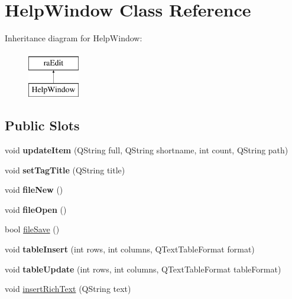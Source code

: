 \hypertarget{classHelpWindow}{
\section{HelpWindow Class Reference}
\label{classHelpWindow}
}
Inheritance diagram for HelpWindow:\begin{figure}[H]
\begin{center}
\leavevmode
\includegraphics[height=2.000000cm]{classHelpWindow}
\end{center}
\end{figure}
\subsection*{Public Slots}
\begin{DoxyCompactItemize}
\item 
\hypertarget{classHelpWindow_a2a22e67622ca5caec13541c54d83c34e}{
void {\bfseries updateItem} (QString full, QString shortname, int count, QString path)}
\label{classHelpWindow_a2a22e67622ca5caec13541c54d83c34e}

\item 
\hypertarget{classHelpWindow_a003f5e69d146673c6fffbd2b61b8457c}{
void {\bfseries setTagTitle} (QString title)}
\label{classHelpWindow_a003f5e69d146673c6fffbd2b61b8457c}

\item 
\hypertarget{classHelpWindow_a238e9ecb48e1b03fafc9fdec485b38ff}{
void {\bfseries fileNew} ()}
\label{classHelpWindow_a238e9ecb48e1b03fafc9fdec485b38ff}

\item 
\hypertarget{classHelpWindow_a156cdefe1185e8463401180539d1f1d7}{
void {\bfseries fileOpen} ()}
\label{classHelpWindow_a156cdefe1185e8463401180539d1f1d7}

\item 
bool \hyperlink{classHelpWindow_a72a7a043e82cda7bbe3947d6e42b1091}{fileSave} ()
\item 
\hypertarget{classHelpWindow_a26b2d65fb4edc7e17e5e128c7502ed2a}{
void {\bfseries tableInsert} (int rows, int columns, QTextTableFormat format)}
\label{classHelpWindow_a26b2d65fb4edc7e17e5e128c7502ed2a}

\item 
\hypertarget{classHelpWindow_a4cb62078833d3e9d8ce368e9d398b981}{
void {\bfseries tableUpdate} (int rows, int columns, QTextTableFormat tableFormat)}
\label{classHelpWindow_a4cb62078833d3e9d8ce368e9d398b981}

\item 
void \hyperlink{classHelpWindow_a5aa06e245b3a9526c35842b49fda3fd2}{insertRichText} (QString text)
\end{DoxyCompactItemize}
